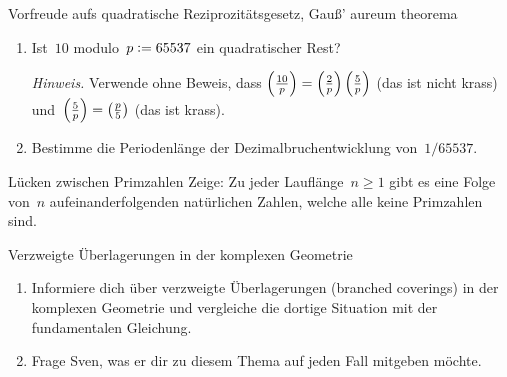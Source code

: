\documentclass{uebblatt}
\begin{document}
\begin{aufgabe}{Vorfreude aufs quadratische Reziprozitätsgesetz, Gauß' aureum theorema}
\begin{enumerate}
\item Ist~$10$ modulo~$p \vcentcolon= 65537$ ein quadratischer Rest?

{\tiny\emph{Hinweis.} Verwende ohne Beweis, dass $\left(\frac{10}{p}\right) = \left(\frac{2}{p}\right)
\left(\frac{5}{p}\right)$ (das ist nicht krass) und~$\left(\frac{5}{p}\right) = \left(\frac{p}{5}\right)$ (das ist krass).\par}

\item Bestimme die Periodenlänge der Dezimalbruchentwicklung von~$1/65537$.

\end{enumerate}
\end{aufgabe}

\begin{aufgabe*}{Lücken zwischen Primzahlen}
Zeige: Zu jeder Lauflänge~$n \geq 1$ gibt es eine Folge von~$n$
aufeinanderfolgenden natürlichen Zahlen, welche alle keine Primzahlen sind.
\end{aufgabe*}

\begin{aufgabe*}{Verzweigte Überlagerungen in der komplexen Geometrie}
\begin{enumerate}
\item Informiere dich über verzweigte Überlagerungen (branched coverings) in der
komplexen Geometrie und vergleiche die dortige Situation mit der fundamentalen
Gleichung.
\item Frage Sven, was er dir zu diesem Thema auf jeden Fall mitgeben möchte.
\end{enumerate}
\end{aufgabe*}
\end{document}

